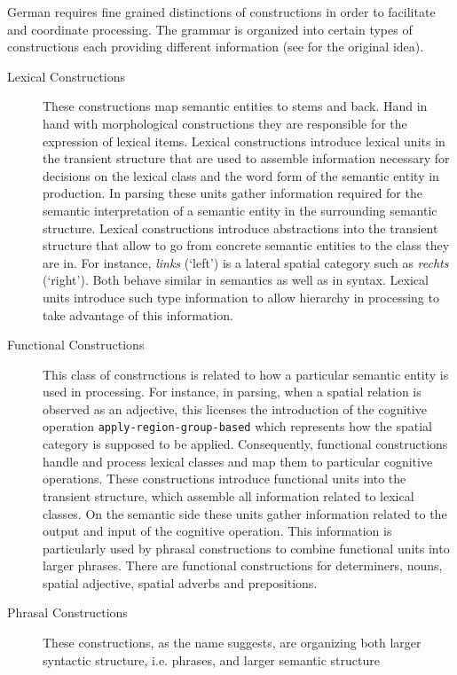 German requires fine grained distinctions of constructions
in order to facilitate and coordinate processing. The grammar is 
organized into certain types of constructions each providing different information
(see \citealp{steels2011phrasal} for the original idea). 
\begin{description}
\item[Lexical Constructions] These constructions map semantic entities
to stems and back. Hand in hand with morphological constructions they
are responsible for the expression of lexical items. Lexical constructions
introduce lexical units in the transient structure that are used to assemble
information necessary for decisions on the lexical class and the word form 
of the semantic entity in production. In parsing these units gather information 
required for the semantic interpretation of a semantic entity in the 
surrounding semantic structure. Lexical constructions introduce abstractions
into the transient structure that allow to go from concrete semantic entities
to the class they are in. For instance, \textit{links} (`left') is a lateral spatial 
category such as \textit{rechts} (`right'). Both behave similar in semantics 
as well as in syntax. Lexical units introduce such type information
to allow hierarchy in processing to take advantage of this information.
\item[Functional Constructions] This class of constructions is related to
how a particular semantic entity is used in processing. For instance, in parsing,
when a spatial relation is observed as an adjective, this licenses the introduction 
of the cognitive operation {\footnotesize\tt apply-region-group-based} which represents how 
the spatial category is supposed to be applied. Consequently, functional constructions 
handle and process lexical classes and map them to particular cognitive operations.
These constructions introduce functional units into the transient structure, which
assemble all information related to lexical classes. On the semantic side
these units gather information related to the output and input of 
the cognitive operation. This information is particularly used by phrasal constructions
to combine functional units into larger phrases.
There are functional constructions for determiners, nouns, spatial adjective, spatial
adverbs and prepositions.
\item[Phrasal Constructions] These constructions, as the name suggests, are organizing both
larger syntactic structure, i.e. phrases, and larger semantic structure

\end{description}
